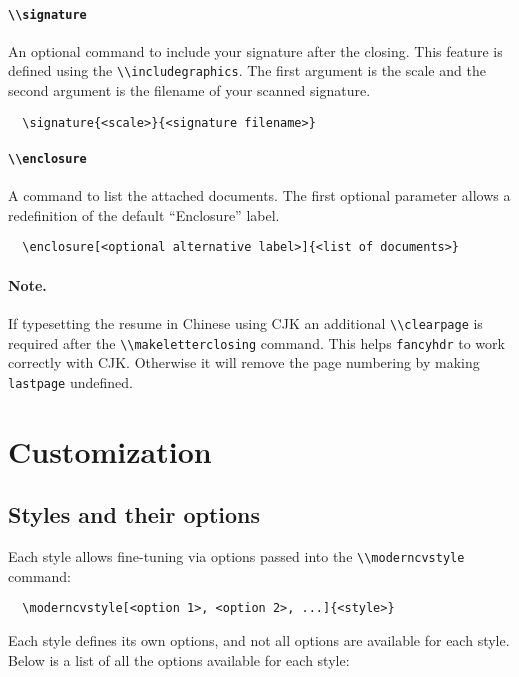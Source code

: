 \documentclass[a4paper, 11pt]{article}
\newcommand{\note}{\paragraph{Note.}}
\newcommand{\code}[1]{\lstinline!#1!}
\begin{document}
\paragraph{\code{\\signature}}
An optional command to include your signature after the closing. This feature is defined using the \code{\\includegraphics}. The first argument is the scale and the second argument is the filename of your scanned signature.
\begin{lstlisting}
  \signature{<scale>}{<signature filename>}
\end{lstlisting}

\paragraph{\code{\\enclosure}}
A command to list the attached documents. The first optional parameter allows a redefinition of the default ``Enclosure'' label.
\begin{lstlisting}
  \enclosure[<optional alternative label>]{<list of documents>}
\end{lstlisting}

\note If typesetting the resume in Chinese using CJK an additional \code{\\clearpage} is required after the \code{\\makeletterclosing} command. This helps \code{fancyhdr} to work correctly with CJK. Otherwise it will remove the page numbering by making \code{lastpage} undefined.

\section{Customization}
\label{section:customization}
\subsection{Styles and their options}
\label{section:customization:stylesAndOptions}
Each style allows fine-tuning via options passed into the \code{\\moderncvstyle} command:
\begin{lstlisting}
  \moderncvstyle[<option 1>, <option 2>, ...]{<style>}
\end{lstlisting}
Each style defines its own options, and not all options are available for each style.
Below is a list of all the options available for each style:
\end{document}
